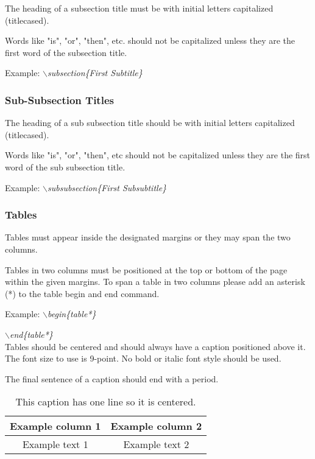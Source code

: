 \documentclass[a4paper,twoside]{article}
\begin{document}
The heading of a subsection title must be with initial letters
capitalized (titlecased).

Words like "is", "or", "then", etc. should not be capitalized unless
they are the first word of the subsection title.

Example: \textit{$\backslash$subsection\{First Subtitle\}}

\subsubsection{Sub-Subsection Titles}

The heading of a sub subsection title should be with initial letters
capitalized (titlecased).

Words like "is", "or", "then", etc should not be capitalized unless
they are the first word of the sub subsection title.

Example: \textit{$\backslash$subsubsection\{First Subsubtitle\}}

\subsubsection{Tables}

Tables must appear inside the designated margins or they may span
the two columns.

Tables in two columns must be positioned at the top or bottom of the
page within the given margins. To span a table in two columns please add an asterisk (*) to the table begin and end command.

Example: \textit{$\backslash$begin\{table*\}}

\hspace*{1.5cm}\textit{$\backslash$end\{table*\}}\\

Tables should be centered and should always have a caption
positioned above it. The font size to use is 9-point. No bold or
italic font style should be used.

The final sentence of a caption should end with a period.

\begin{table}[h]
\caption{This caption has one line so it is
centered.}\label{tab:example1} \centering
\begin{tabular}{|c|c|}
  \hline
  Example column 1 & Example column 2 \\
  \hline
  Example text 1 & Example text 2 \\
  \hline
\end{tabular}
\end{table}
\end{document}
